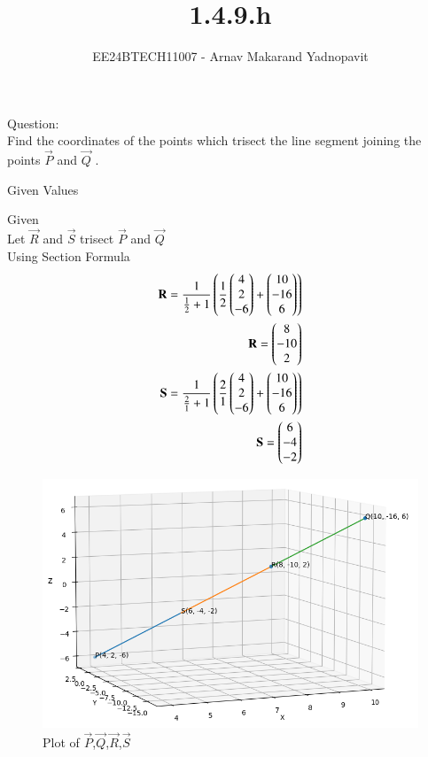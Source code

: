 \documentclass[journal]{IEEEtran}
\begin{document}

\title{1.4.9.h}
\author{EE24BTECH11007 - Arnav Makarand Yadnopavit}
{\let\newpage\relax\maketitle}
\renewcommand{\thefigure}{\theenumi}
\renewcommand{\thetable}{\theenumi}
\setlength{\intextsep}{10pt} %
\renewcommand{\thetable}{\theenumi}
Question:\\
Find the coordinates of the points which trisect the line segment joining the points
$\vec{P}$  and $\vec{Q}$ .\\
\solution
\begin{table}[h]
    \centering
    
    \caption{Given Values}
    \label{tab:1}
\end{table}
Given\\
Let $\vec{R}$ and $\vec{S}$ trisect $\vec{P}$ and $\vec{Q}$\\
Using Section Formula
\begin{align}
\mathbf{R}=\frac{1}{\frac{1}{2}+1}\left(\frac{1}{2}\begin{pmatrix}4\\2\\-6\end{pmatrix}+\begin{pmatrix}10\\-16\\6\end{pmatrix}\right)\\
\mathbf{R}=\begin{pmatrix}8\\-10\\2\end{pmatrix}\\
\mathbf{S}=\frac{1}{\frac{2}{1}+1}\left(\frac{2}{1}\begin{pmatrix}4\\2\\-6\end{pmatrix}+\begin{pmatrix}10\\-16\\6\end{pmatrix}\right)\\
\mathbf{S}=\begin{pmatrix}6\\-4\\-2\end{pmatrix}
\end{align}
\begin{figure}[h]
    \centering
    \includegraphics[width=\columnwidth]{figs/fig.png}
    \caption{Plot of $\vec{P}$,$\vec{Q}$,$\vec{R}$,$\vec{S}$}
 \end{figure}
\end{document}
